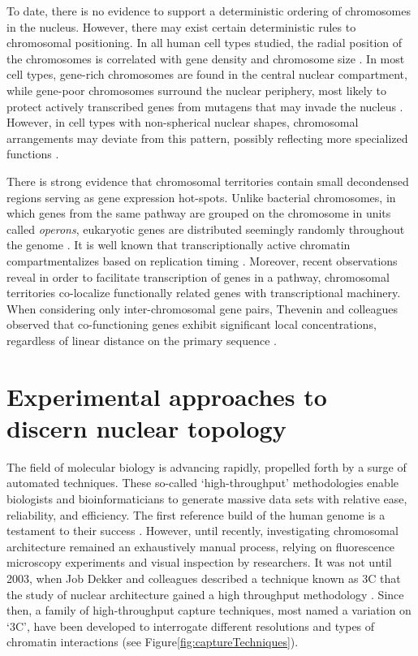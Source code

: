 To date, there is no evidence to support a deterministic ordering of chromosomes in the nucleus.  However, there may exist certain deterministic rules to
chromosomal positioning.  In all human cell types studied, the radial position of the chromosomes is correlated with gene density and chromosome
size \citep{sun2000,bolzer2005}.  In most cell types, gene-rich chromosomes are found in the central nuclear compartment, while gene-poor
chromosomes surround the nuclear periphery, most likely to protect actively transcribed genes from mutagens that may invade the nucleus \citep{boyle2001,kozubek2005}.
However, in cell types with non-spherical nuclear shapes, chromosomal arrangements may deviate from this pattern, possibly reflecting more
specialized functions \citep{bolzer2005}.

There is strong evidence that chromosomal territories contain small decondensed regions serving as gene expression hot-spots.  Unlike bacterial chromosomes,
in which genes from the same pathway are grouped on the chromosome in units called \textit{\glspl{operon}}, eukaryotic genes are distributed seemingly randomly
throughout the genome \citep{jacob1961}.  It is well known that transcriptionally active chromatin compartmentalizes based on replication
timing \citep{ferreira1997,sadoni1999,thevenin2014}.  Moreover, recent observations reveal in order to facilitate transcription of genes in
a pathway, chromosomal territories co-localize functionally related genes with transcriptional machinery.  When considering only inter-chromosomal gene
pairs, Thevenin and colleagues observed that co-functioning genes exhibit significant local concentrations, regardless of linear distance on the primary
sequence \citep{thevenin2014}.

\section*{Experimental approaches to discern nuclear topology}

The field of molecular biology is advancing rapidly, propelled forth by a surge of automated techniques.  These so-called `\gls{high-throughput}'
methodologies enable biologists and bioinformaticians to generate massive data sets with relative ease, reliability, and efficiency.  The first
reference build of the human genome is a testament to their success \citep{hgsc2004}.  However, until recently, investigating chromosomal architecture
remained an exhaustively manual process, relying on fluorescence microscopy experiments and visual inspection by researchers.  It was not until 2003,
when Job Dekker and colleagues described a technique known as \gls{3C} that the study of nuclear architecture gained a high throughput methodology
 \citep{dekker2002}. Since then, a family of high-throughput capture techniques, most named a variation on `\gls{3C}', have been developed to interrogate
different resolutions and types of chromatin interactions (see Figure\ref{fig:captureTechniques}).

